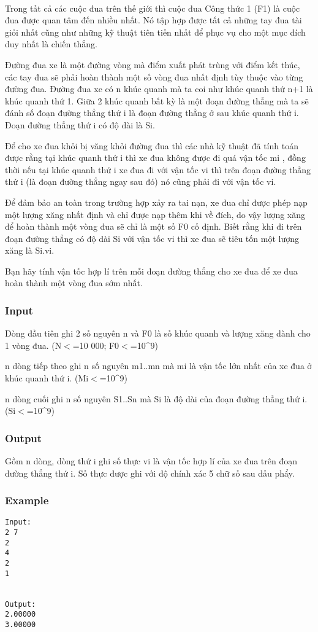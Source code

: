 

 

Trong tất cả các cuộc đua trên thế giới thì cuộc đua Công thức 1 (F1) là cuộc đua được quan tâm đến nhiều nhất. Nó tập hợp được tất cả những tay đua tài giỏi nhất cũng như những kỹ thuật tiên tiến nhất để phục vụ cho một mục đích duy nhất là chiến thắng.

Đường đua xe là một đường vòng mà điểm xuất phát trùng với điểm kết thúc, các tay đua sẽ phải hoàn thành một số vòng đua nhất định tùy thuộc vào từng đường đua. Đường đua xe có n khúc quanh mà ta coi như khúc quanh thứ n+1 là khúc quanh thứ 1. Giữa 2 khúc quanh bất kỳ là một đoạn đường thẳng mà ta sẽ đánh số đoạn đường thẳng thứ i là đoạn đường thẳng ở sau khúc quanh thứ i. Đoạn đường thẳng thứ i có độ dài là Si.

Để cho xe đua khỏi bị văng khỏi đường đua thì các nhà kỹ thuật đã tính toán được rằng tại khúc quanh thứ i thì xe đua không được đi quá vận tốc mi , đồng thời nếu tại khúc quanh thứ i xe đua đi với vận tốc vi thì trên đoạn đường thẳng thứ i (là đoạn đường thẳng ngay sau đó) nó cũng phải đi với vận tốc vi.

Để đảm bảo an toàn trong trường hợp xảy ra tai nạn, xe đua chỉ được phép nạp một lượng xăng nhất định và chỉ được nạp thêm khi về đích, do vậy lượng xăng để hoàn thành một vòng đua sẽ chỉ là một số F0 cố định. Biết rằng khi đi trên đoạn đường thẳng có độ dài Si với vận tốc vi thì xe đua sẽ tiêu tốn một lượng xăng là Si.vi.

Bạn hãy tính vận tốc hợp lí trên mỗi đoạn đường thẳng cho xe đua để xe đua hoàn thành một vòng đua sớm nhất.

\subsubsection{Input}

Dòng đầu tiên ghi 2 số nguyên n và F0 là số khúc quanh và lượng xăng dành cho 1 vòng đua. (N$<$=10 000; F0$<$=10\textasciicircum9)

n dòng tiếp theo ghi n số nguyên m1..mn mà mi là vận tốc lớn nhất của xe đua ở khúc quanh thứ i. (Mi$<$=10\textasciicircum9)

n dòng cuối ghi n số nguyên S1..Sn mà Si là độ dài của đoạn đường thẳng thứ i. (Si$<$=10\textasciicircum9)

\subsubsection{Output}

Gồm n dòng, dòng thứ i ghi số thực vi là vận tốc hợp lí của xe đua trên đoạn đường thẳng thứ i. Số thực được ghi với độ chính xác 5 chữ số sau dấu phẩy.

\subsubsection{Example}
\begin{verbatim}
Input:
2 7
2 
4 
2
1


Output:
2.00000
3.00000
\end{verbatim}